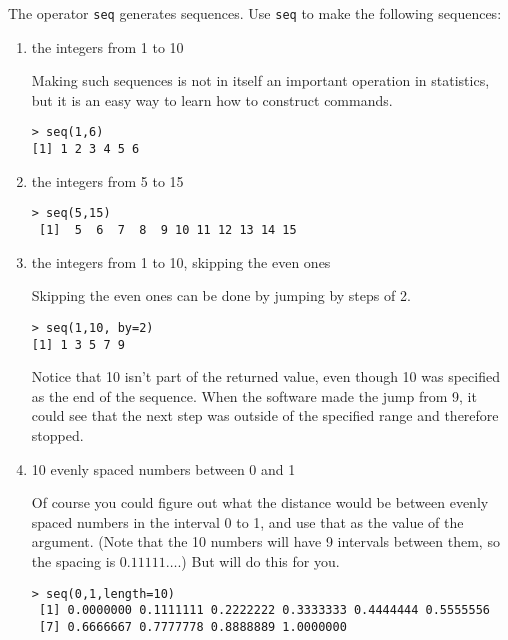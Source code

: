 

The operator \texttt{seq} generates sequences.  
Use \texttt{seq} to make the following sequences:

\begin{enumerate}
\item the integers from 1 to 10 \TextEntry

\begin{AnswerText}
Making such sequences is not in itself an important operation in
statistics, but it is an easy way to learn how to construct commands.
\begin{verbatim}
> seq(1,6)
[1] 1 2 3 4 5 6
\end{verbatim}
\end{AnswerText}

\item the integers from 5 to 15 \TextEntry

\begin{AnswerText}
\begin{verbatim}
> seq(5,15)
 [1]  5  6  7  8  9 10 11 12 13 14 15
\end{verbatim}
\end{AnswerText}


\item the integers from 1 to 10, skipping the even ones \TextEntry

\begin{AnswerText}
Skipping the even ones can be done by jumping by steps of 2.
\begin{verbatim}
> seq(1,10, by=2)
[1] 1 3 5 7 9
\end{verbatim}
Notice that 10 isn't part of the returned value, even though 10 was
specified as the end of the sequence.  When the software made the jump
from 9, it could see that the next step was outside of the specified
range and therefore stopped.
\end{AnswerText}

\item 10 evenly spaced numbers between 0 and 1 \TextEntry

\begin{AnswerText}
Of course you could figure out what the distance would be between
evenly spaced numbers in the interval 0 to 1, and use that as the
value of the  argument. (Note that the 10 numbers will have
9 intervals between them, so the spacing is $0.11111 \ldots$.) But  will do this for you.
\begin{verbatim}
> seq(0,1,length=10)
 [1] 0.0000000 0.1111111 0.2222222 0.3333333 0.4444444 0.5555556
 [7] 0.6666667 0.7777778 0.8888889 1.0000000
\end{verbatim}
\end{AnswerText}

\end{enumerate}

